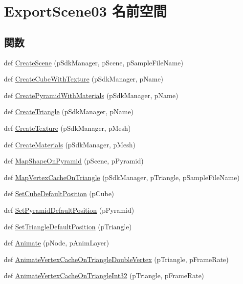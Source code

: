 \hypertarget{namespace_export_scene03}{}\section{Export\+Scene03 名前空間}
\label{namespace_export_scene03}
\subsection*{関数}
\begin{DoxyCompactItemize}
\item 
def \hyperlink{namespace_export_scene03_a046d5e67dee0735f097817fd9f265d98}{Create\+Scene} (p\+Sdk\+Manager, p\+Scene, p\+Sample\+File\+Name)
\item 
def \hyperlink{namespace_export_scene03_a8739e28cfd3f0638e215a881d7704d11}{Create\+Cube\+With\+Texture} (p\+Sdk\+Manager, p\+Name)
\item 
def \hyperlink{namespace_export_scene03_a256d42c26c748fd323177eb81f2b65a0}{Create\+Pyramid\+With\+Materials} (p\+Sdk\+Manager, p\+Name)
\item 
def \hyperlink{namespace_export_scene03_a14b5c9490b1e23dea1de435163e84778}{Create\+Triangle} (p\+Sdk\+Manager, p\+Name)
\item 
def \hyperlink{namespace_export_scene03_a31fdba5cdc721d7ab9f9e8ed00c60a1a}{Create\+Texture} (p\+Sdk\+Manager, p\+Mesh)
\item 
def \hyperlink{namespace_export_scene03_af03f77efbc17723316e1607c81c1e4ad}{Create\+Materials} (p\+Sdk\+Manager, p\+Mesh)
\item 
def \hyperlink{namespace_export_scene03_a00a44ad6299ef05f8843e5a5472220c9}{Map\+Shape\+On\+Pyramid} (p\+Scene, p\+Pyramid)
\item 
def \hyperlink{namespace_export_scene03_a684086a0863c11c1c12b47f92385b90b}{Map\+Vertex\+Cache\+On\+Triangle} (p\+Sdk\+Manager, p\+Triangle, p\+Sample\+File\+Name)
\item 
def \hyperlink{namespace_export_scene03_a1de39a36aa938498a144aaa0742ecee0}{Set\+Cube\+Default\+Position} (p\+Cube)
\item 
def \hyperlink{namespace_export_scene03_a68c815a8d183c8818484a655f38e770e}{Set\+Pyramid\+Default\+Position} (p\+Pyramid)
\item 
def \hyperlink{namespace_export_scene03_ac705c3499f2ddadd170981132fa6cc2f}{Set\+Triangle\+Default\+Position} (p\+Triangle)
\item 
def \hyperlink{namespace_export_scene03_a695b4328e59ed00fc72b6a9016e2df0d}{Animate} (p\+Node, p\+Anim\+Layer)
\item 
def \hyperlink{namespace_export_scene03_a188a9f5a4ef77fd02d2bd351bf81df1b}{Animate\+Vertex\+Cache\+On\+Triangle\+Double\+Vertex} (p\+Triangle, p\+Frame\+Rate)
\item 
def \hyperlink{namespace_export_scene03_a440906a7a98424c5e969382ff35a1565}{Animate\+Vertex\+Cache\+On\+Triangle\+Int32} (p\+Triangle, p\+Frame\+Rate)
\end{DoxyCompactItemize}
